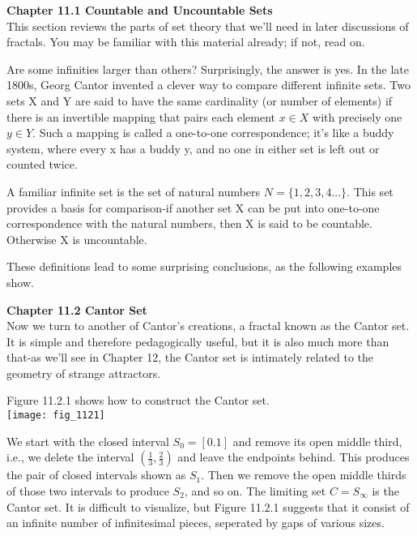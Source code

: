 \documentclass{article}
\newcommand\tab[1][1cm]{\hspace*{#1}}
\begin{document}
\textbf {Chapter 11.1 Countable and Uncountable Sets} \\
This section reviews the parts of set theory that we'll need in later discussions of fractals. You may be familiar with this material already; if not, read on. \\ \tab

Are some infinities larger than others? Surprisingly, the answer is yes. In the late 1800s, Georg Cantor invented a clever way to compare different infinite sets. Two sets X and Y are said to have the same cardinality (or number of elements) if there is an invertible mapping that pairs each element $x \in X$ with precisely one $y \in Y$. Such a mapping is called a one-to-one correspondence; it's like a buddy system, where every x has a buddy y, and no one in either set is left out or counted twice. \\ \tab

A familiar infinite set is the set of natural numbers $N=\{1,2,3,4...\}$. This set provides a basis for comparison-if another set X can be put into one-to-one correspondence with the natural numbers, then X is said to be countable. Otherwise X is uncountable. \\ \tab 

These definitions lead to some surprising conclusions, as the following examples show.

\textbf {Chapter 11.2 Cantor Set} \\

Now we turn to another of Cantor's creations, a fractal known as the Cantor set. It is simple and therefore pedagogically useful, but it is also much more than that-as we'll see in Chapter 12, the Cantor set is intimately related to the geometry of strange attractors. \\ \tab

Figure 11.2.1 shows how to construct the Cantor set. \\

\texttt{[image: fig\_1121]}

We start with the closed interval $S_{0}=[0.1]$ and remove its open middle third, i.e., we delete the interval $(\frac{1}{3}, \frac{2}{3})$ and leave the endpoints behind. This produces the pair of closed intervals shown as $S_{1}$. Then we remove the open middle thirds of those two intervals to produce $S_{2}$, and so on. The limiting set $C=S_{\infty}$ is the Cantor set. It is difficult to visualize, but Figure 11.2.1 suggests that it consist of an infinite number of infinitesimal pieces, seperated by gaps of various sizes. \\
\end{document}
